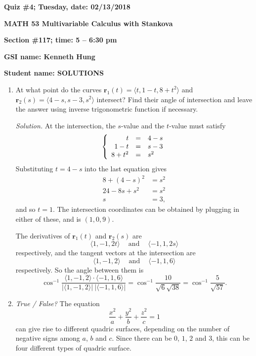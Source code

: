 \documentclass{article}
\newcommand{\rr}{\mathbf{r}}
\begin{document}
{\bf Quiz \#4; Tuesday, date: 02/13/2018}

{\bf MATH 53 Multivariable Calculus with Stankova}

{\bf Section \#117; time: 5 -- 6:30 pm}

{\bf GSI name: Kenneth Hung}

{\bf Student name: SOLUTIONS}

\vspace*{0.25in}

\begin{enumerate}
\item At what point do the curves $\rr_1(t) = \langle t, 1 - t, 8 + t^2 \rangle$ and $\rr_2(s) = \langle 4 - s, s - 3, s^2 \rangle$ intersect? Find their angle of intersection and leave the answer using inverse trigonometric function if necessary.

{\em Solution.} At the intersection, the $s$-value and the $t$-value must satisfy
\[
\left\{\begin{array}{r c l}
t & = & 4 - s \\
1 - t & = & s - 3 \\
8 + t^2 & = & s^2
\end{array}\right.
\]
Substituting $t = 4-s$ into the last equation gives
\begin{align*}
8 + (4 - s)^2 & = s^2 \\
24 - 8s + s^2 & = s^2 \\
s & = 3,
\end{align*}
and so $t = 1$. The intersection coordinates can be obtained by plugging in either of these, and is $(1, 0, 9)$.

The derivatives of $\rr_1(t)$ and $\rr_2(s)$ are
\[
\langle 1, -1, 2t \rangle ~~~~ \text{ and } ~~~~ \langle -1, 1, 2s \rangle
\]
respectively, and the tangent vectors at the intersection are
\[
\langle 1, -1, 2 \rangle ~~~~ \text{ and } ~~~~ \langle -1, 1, 6 \rangle
\]
respectively. So the angle between them is
\[
\cos^{-1} \frac{\langle 1, -1, 2 \rangle \cdot \langle -1, 1, 6 \rangle}{|\langle 1, -1, 2 \rangle| ~ |\langle -1, 1, 6 \rangle|} = \cos^{-1} \frac{10}{\sqrt{6} \sqrt{38}} = \cos^{-1} \frac{5}{\sqrt{57}}.
\]

\item {\em True / False?} The equation
\[
\frac{x^2}{a} + \frac{y^2}{b} + \frac{z^2}{c} = 1
\]
can give rise to different quadric surfaces, depending on the number of negative signs among $a$, $b$ and $c$. Since there can be $0$, $1$, $2$ and $3$, this can be four different types of quadric surface.


\end{enumerate}
\end{document}
